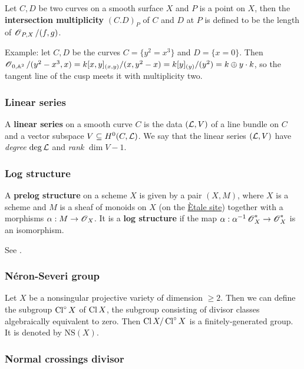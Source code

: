 \documentclass[11pt, english]{article}
\begin{document}
Let $C,D$ be two curves on a smooth surface $X$ and $P$ is a point on $X$, then the \textbf{intersection multiplicity} $(C.D)_P$ of $C$ and $D$ at $P$ is defined to be the length of $\operatorname{\mathscr{O}}_{P,X}/(f,g)$.

Example: let $C,D$ be the curves $C= \{ y^2=x^3 \}$ and $D = \{x = 0\}$. Then $\operatorname{\mathscr{O}}_{0,\mathbb{A}^2}/(y^2-x^3,x) = k[x,y]_{(x,y)}/(x,y^2-x)=k[y]_{(y)} /(y^2)=k \oplus y \cdot k$, so the tangent line of the cusp meets it with multiplicity two.


\subsubsection{Linear series}
\label{linearseries}

A \textbf{linear series} on a smooth curve $C$ is the data $(\mathcal{L},V)$ of a line bundle on $C$ and a vector subspace $V \subseteq H^0(C,\mathcal{L})$. We say that the linear series $(\mathcal{L},V)$ have \emph{degree} $\deg \mathcal{L}$ and \emph{rank} $\dim V - 1$. 

\subsubsection{Log structure}
\label{logstructure}

A \textbf{prelog structure} on a scheme $X$ is given by a pair $(X,M)$, where $X$ is a scheme and $M$ is a sheaf of monoids on $X$ (on the \hyperref[etalesite]{Ètale site}) together with a morphisms $\alpha:M \to \operatorname{\mathscr{O}}_X$. It is a \textbf{log structure} if the map $\alpha:\alpha^{-1}\operatorname{\mathscr{O}}_X^\ast \to \operatorname{\mathscr{O}}_X^\ast$ is an isomorphism.

See \cite{kato_log}.

\subsubsection{Néron-Severi group}
\label{neronseveri}

Let $X$ be a nonsingular projective variety of dimension $\geq 2$. Then we can define the subgroup $\operatorname{Cl}^\circ X $ of $\operatorname{Cl} X$, the subgroup consisting of divisor classes algebraically equivalent to zero. Then $\operatorname{Cl} X/\operatorname{Cl}^\circ X$ is a finitely-generated group. It is denoted by $\mathrm{NS}(X)$.

\subsubsection{Normal crossings divisor}
\label{normalcrossingsdivisor}
\end{document}
